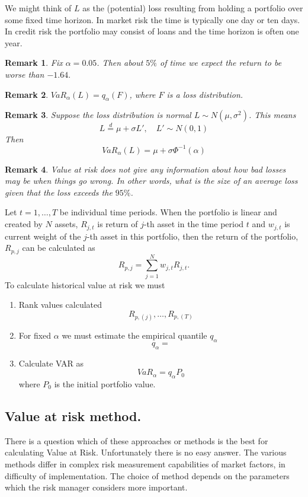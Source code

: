 \documentclass{book}
\newtheorem{remark}{Remark}[section]
\begin{document}
We might think of $L$ as the (potential) loss resulting from holding a portfolio over some fixed time horizon. In market risk the time is typically one day or ten days. In credit risk the portfolio may consist of loans and the time horizon is often one year. 
\begin{remark}
Fix $\alpha=0.05$. Then about $5\%$ of time we expect the return to be worse than $-1.64.$
\end{remark}
\begin{remark}
$VaR_{\alpha}(L)=q_{\alpha}(F)$, where $F$ is a loss distribution.
\end{remark}
\begin{remark}
Suppose the loss distribution is normal $L\sim N(\mu,\sigma^{2})$. This means 
$$
L\stackrel{d}=\mu +\sigma L',\quad L'\sim N(0,1)
$$
Then 
$$VaR_{\alpha}(L)=\mu+\sigma\Phi^{-1}(\alpha)$$
\end{remark}
\begin{remark}
Value at risk does not give any information about how bad losses may be when things go wrong. In other words, what is the size of an average loss given that the loss exceeds the $95\%$.
\end{remark}
Let $t=1,\dots,T$ be individual time periods. When the portfolio is linear and created by $N$ assets, $R_{j,t}$ is return of $j$-th asset in the time period $t$ and $w_{j,t}$ is current weight of the $j$-th asset in this portfolio, then the return of the portfolio, $R_{p,j}$ can be calculated as
$$
R_{p,j}=\sum_{j=1}^{N}w_{j,t}R_{j,t}.
$$
To calculate historical value at risk we must
\begin{enumerate}
\item Rank values calculated 
$$
R_{p,(j)},\dots,R_{p,(T)}
$$
\item For fixed $\alpha$ we must estimate the empirical quantile $q_{\alpha}$
$$
q_{\alpha}=
$$
\item Calculate VAR as
$$
VaR_{\alpha}=q_{\alpha}P_{0}
$$
where $P_{0}$ is the initial portfolio value.
\end{enumerate}
\subsection{Value at risk method.}
There is a question which of these approaches or methods is the best for calculating Value at Risk. Unfortunately there is no easy answer. The various methods differ in complex risk measurement capabilities of market factors, in difficulty of implementation. The choice of method depends on the parameters which the risk manager considers more important.
\end{document}
